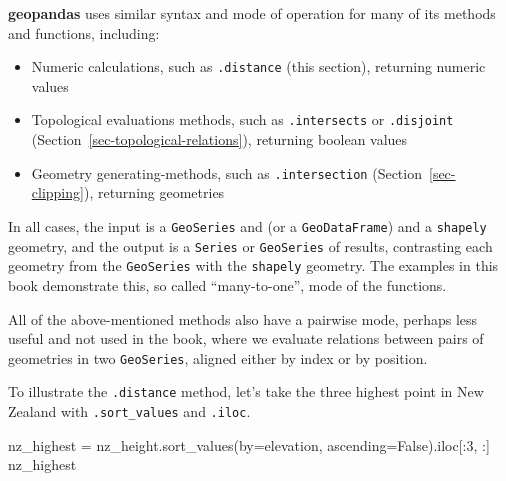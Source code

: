 \documentclass[
  letterpaper,
]{krantz}
\newenvironment{Shaded}{\begin{snugshade}}{\end{snugshade}}
\newcommand{\DecValTok}[1]{\textcolor[rgb]{0.68,0.00,0.00}{#1}}
\newcommand{\NormalTok}[1]{\textcolor[rgb]{0.00,0.23,0.31}{#1}}
\newcommand{\OperatorTok}[1]{\textcolor[rgb]{0.37,0.37,0.37}{#1}}
\newcommand{\StringTok}[1]{\textcolor[rgb]{0.13,0.47,0.30}{#1}}
\newcommand{\VariableTok}[1]{\textcolor[rgb]{0.07,0.07,0.07}{#1}}
\providecommand{\tightlist}{%
  \setlength{\itemsep}{0pt}\setlength{\parskip}{0pt}}\usepackage{longtable,booktabs,array}
\begin{document}
\begin{tcolorbox}[enhanced jigsaw, title=\textcolor{quarto-callout-note-color}{\faInfo}\hspace{0.5em}{Note}, arc=.35mm, toprule=.15mm, titlerule=0mm, colframe=quarto-callout-note-color-frame, breakable, toptitle=1mm, bottomtitle=1mm, rightrule=.15mm, colbacktitle=quarto-callout-note-color!10!white, leftrule=.75mm, left=2mm, bottomrule=.15mm, opacityback=0, coltitle=black, opacitybacktitle=0.6, colback=white]

\textbf{geopandas} uses similar syntax and mode of operation for many of
its methods and functions, including:

\begin{itemize}
\tightlist
\item
  Numeric calculations, such as \texttt{.distance} (this section),
  returning numeric values
\item
  Topological evaluations methods, such as \texttt{.intersects} or
  \texttt{.disjoint} (Section~\ref{sec-topological-relations}),
  returning boolean values
\item
  Geometry generating-methods, such as \texttt{.intersection}
  (Section~\ref{sec-clipping}), returning geometries
\end{itemize}

In all cases, the input is a \texttt{GeoSeries} and (or a
\texttt{GeoDataFrame}) and a \texttt{shapely} geometry, and the output
is a \texttt{Series} or \texttt{GeoSeries} of results, contrasting each
geometry from the \texttt{GeoSeries} with the \texttt{shapely} geometry.
The examples in this book demonstrate this, so called ``many-to-one'',
mode of the functions.

All of the above-mentioned methods also have a pairwise mode, perhaps
less useful and not used in the book, where we evaluate relations
between pairs of geometries in two \texttt{GeoSeries}, aligned either by
index or by position.

\end{tcolorbox}

To illustrate the \texttt{.distance} method, let's take the three
highest point in New Zealand with \texttt{.sort\_values} and
\texttt{.iloc}.

\begin{Shaded}
\begin{Highlighting}[]
\NormalTok{nz\_highest }\OperatorTok{=}\NormalTok{ nz\_height.sort\_values(by}\OperatorTok{=}\StringTok{\textquotesingle{}elevation\textquotesingle{}}\NormalTok{, ascending}\OperatorTok{=}\VariableTok{False}\NormalTok{).iloc[:}\DecValTok{3}\NormalTok{, :]}
\NormalTok{nz\_highest}
\end{Highlighting}
\end{Shaded}
\end{document}
